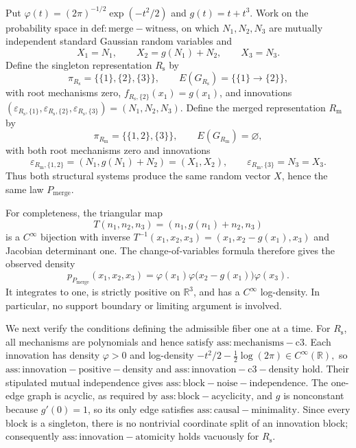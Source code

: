 Put \(\varphi(t)=(2\pi)^{-1/2}\exp(-t^2/2)\) and \(g(t)=t+t^3\).  Work on the probability space in \(\mathrm{def:merge-witness}\), on which \(N_1,N_2,N_3\) are mutually independent standard Gaussian random variables and
\[
 X_1=N_1,\qquad X_2=g(N_1)+N_2,\qquad X_3=N_3.
\]
Define the singleton representation \(R_{\mathrm{s}}\) by
\[
 \pi_{R_{\mathrm{s}}}=\bigl\{\{1\},\{2\},\{3\}\bigr\},
 \qquad E(G_{R_{\mathrm{s}}})=\bigl\{\{1\}\to\{2\}\bigr\},
\]
with root mechanisms zero, \(f_{R_{\mathrm{s}},\{2\}}(x_1)=g(x_1)\), and innovations
\(
 (\varepsilon_{R_{\mathrm{s}},\{1\}},
   \varepsilon_{R_{\mathrm{s}},\{2\}},
   \varepsilon_{R_{\mathrm{s}},\{3\}})=(N_1,N_2,N_3).
\)
Define the merged representation \(R_{\mathrm{m}}\) by
\[
 \pi_{R_{\mathrm{m}}}=\bigl\{\{1,2\},\{3\}\bigr\},
 \qquad E(G_{R_{\mathrm{m}}})=\varnothing,
\]
with both root mechanisms zero and innovations
\[
 \varepsilon_{R_{\mathrm{m}},\{1,2\}}
   =(N_1,g(N_1)+N_2)=(X_1,X_2),
 \qquad
 \varepsilon_{R_{\mathrm{m}},\{3\}}=N_3=X_3.
\]
Thus both structural systems produce the same random vector \(X\), hence the same law \(P_{\mathrm{merge}}\).

For completeness, the triangular map
\[
 T(n_1,n_2,n_3)=(n_1,g(n_1)+n_2,n_3)
\]
is a \(C^\infty\) bijection with inverse
\(
 T^{-1}(x_1,x_2,x_3)=(x_1,x_2-g(x_1),x_3)
\)
and Jacobian determinant one.  The change-of-variables formula therefore gives the observed density
\[
 p_{P_{\mathrm{merge}}}(x_1,x_2,x_3)
   =\varphi(x_1)\varphi\bigl(x_2-g(x_1)\bigr)\varphi(x_3).
\]
It integrates to one, is strictly positive on \(\mathbb R^3\), and has a \(C^\infty\) log-density.  In particular, no support boundary or limiting argument is involved.

We next verify the conditions defining the admissible fiber one at a time.  For \(R_{\mathrm{s}}\), all mechanisms are polynomials and hence satisfy \(\mathrm{ass:mechanisms-c3}\).  Each innovation has density \(\varphi>0\) and log-density
\(
 -t^2/2-\tfrac12\log(2\pi)\in C^\infty(\mathbb R),
\)
so \(\mathrm{ass:innovation-positive-density}\) and \(\mathrm{ass:innovation-c3-density}\) hold.  Their stipulated mutual independence gives \(\mathrm{ass:block-noise-independence}\).  The one-edge graph is acyclic, as required by \(\mathrm{ass:block-acyclicity}\), and \(g\) is nonconstant because \(g'(0)=1\), so its only edge satisfies \(\mathrm{ass:causal-minimality}\).  Since every block is a singleton, there is no nontrivial coordinate split of an innovation block; consequently \(\mathrm{ass:innovation-atomicity}\) holds vacuously for \(R_{\mathrm{s}}\).

